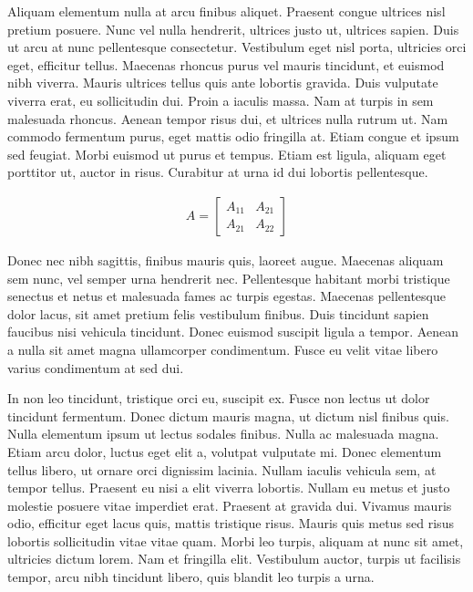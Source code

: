 \documentclass[10pt, a4paper, twocolumn]{article} %
\begin{document}
Aliquam elementum nulla at arcu finibus aliquet. Praesent congue ultrices nisl pretium posuere. Nunc vel nulla hendrerit, ultrices justo ut, ultrices sapien. Duis ut arcu at nunc pellentesque consectetur. Vestibulum eget nisl porta, ultricies orci eget, efficitur tellus. Maecenas rhoncus purus vel mauris tincidunt, et euismod nibh viverra. Mauris ultrices tellus quis ante lobortis gravida. Duis vulputate viverra erat, eu sollicitudin dui. Proin a iaculis massa. Nam at turpis in sem malesuada rhoncus. Aenean tempor risus dui, et ultrices nulla rutrum ut. Nam commodo fermentum purus, eget mattis odio fringilla at. Etiam congue et ipsum sed feugiat. Morbi euismod ut purus et tempus. Etiam est ligula, aliquam eget porttitor ut, auctor in risus. Curabitur at urna id dui lobortis pellentesque.

\begin{align}
	A = 
	\begin{bmatrix}
		A_{11} & A_{21} \\
		A_{21} & A_{22}
	\end{bmatrix}
\end{align}

Donec nec nibh sagittis, finibus mauris quis, laoreet augue. Maecenas aliquam sem nunc, vel semper urna hendrerit nec. Pellentesque habitant morbi tristique senectus et netus et malesuada fames ac turpis egestas. Maecenas pellentesque dolor lacus, sit amet pretium felis vestibulum finibus. Duis tincidunt sapien faucibus nisi vehicula tincidunt. Donec euismod suscipit ligula a tempor. Aenean a nulla sit amet magna ullamcorper condimentum. Fusce eu velit vitae libero varius condimentum at sed dui.

In non leo tincidunt, tristique orci eu, suscipit ex. Fusce non lectus ut dolor tincidunt fermentum. Donec dictum mauris magna, ut dictum nisl finibus quis. Nulla elementum ipsum ut lectus sodales finibus. Nulla ac malesuada magna. Etiam arcu dolor, luctus eget elit a, volutpat vulputate mi. Donec elementum tellus libero, ut ornare orci dignissim lacinia. Nullam iaculis vehicula sem, at tempor tellus. Praesent eu nisi a elit viverra lobortis. Nullam eu metus et justo molestie posuere vitae imperdiet erat. Praesent at gravida dui. Vivamus mauris odio, efficitur eget lacus quis, mattis tristique risus. Mauris quis metus sed risus lobortis sollicitudin vitae vitae quam. Morbi leo turpis, aliquam at nunc sit amet, ultricies dictum lorem. Nam et fringilla elit. Vestibulum auctor, turpis ut facilisis tempor, arcu nibh tincidunt libero, quis blandit leo turpis a urna.
\end{document}
